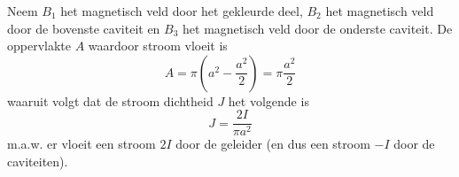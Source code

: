 

\begin{description}[labelwidth=1.5cm, leftmargin=!]
    \item[Opl. :]  
    
        Neem $B_1$ het magnetisch veld door het gekleurde deel, $B_2$ het magnetisch veld door de bovenste caviteit en $B_3$ het magnetisch veld door de onderste caviteit.
        De oppervlakte $A$ waardoor stroom vloeit is
        \begin{equation*}
            A = \pi(a^2 - \frac{a^2}{2}) = \pi\frac{a^2}{2}
        \end{equation*}
        waaruit volgt dat de stroom dichtheid $J$ het volgende is
        \begin{equation*}
            J = \frac{2I}{\pi a^2}
        \end{equation*}
        m.a.w. er vloeit een stroom $2I$ door de geleider (en dus een stroom $-I$ door de caviteiten). \\
        

\end{description}
